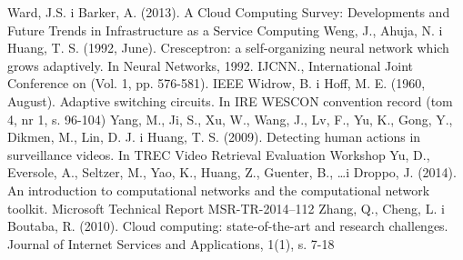 \documentclass[12pt,a4paper,twoside]{article}
\begin{document}
\begin{thebibliography}{99}
 Ward, J.S. i Barker, A. (2013). A Cloud Computing Survey: Developments and Future Trends in Infrastructure as a Service Computing
 Weng, J., Ahuja, N. i Huang, T. S. (1992, June). Cresceptron: a self-organizing neural network which grows adaptively. In Neural Networks, 1992. IJCNN., International Joint Conference on (Vol. 1, pp. 576-581). IEEE
 Widrow, B. i Hoff, M. E. (1960, August). Adaptive switching circuits. In IRE WESCON convention record (tom 4, nr 1, s. 96-104)
 Yang, M., Ji, S., Xu, W., Wang, J., Lv, F., Yu, K., Gong, Y., Dikmen, M., Lin, D. J. i Huang, T. S. (2009). Detecting human actions in surveillance videos. In TREC Video Retrieval Evaluation Workshop
 Yu, D., Eversole, A., Seltzer, M., Yao, K., Huang, Z., Guenter, B., \ldots i Droppo, J. (2014). An introduction to computational networks and the computational network toolkit. Microsoft Technical Report MSR-TR-2014–112
 Zhang, Q., Cheng, L. i Boutaba, R. (2010). Cloud computing: state-of-the-art and research challenges. Journal of Internet Services and Applications, 1(1), s. 7-18

\end{thebibliography}
\clearpage

\listoffigures

\clearpage

\listoftables

\clearpage
\end{document}
